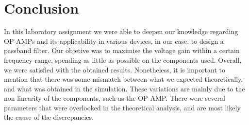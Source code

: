 \section{Conclusion}
\label{resan}
In this laboratory assignment we were able to deepen our knowledge regarding OP-AMPs and its applicability in various devices, in our case, to design a passband filter.
Our objetive was to maximise the voltage gain within a certain frequency range, spending as little as possible on the components used. Overall, we were satisfied with the obtained results.
Nonetheless, it is important to mention that there was some mismatch between what we expected theoretically, and what was obtained in the simulation. These variations are mainly due to the non-linearity of the components, such as the OP-AMP. There were several parameters that were overlooked in the theoretical analysis, and are most likely the cause of the discrepancies.
